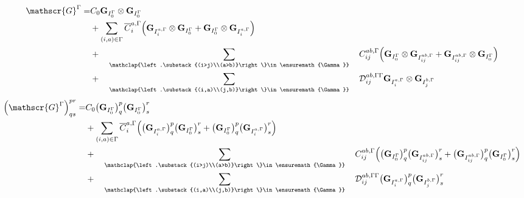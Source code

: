 \documentclass[a4paper,11pt]{article}
\newcommand{\Dmix}{\ensuremath{\mathcal{D}}}
\newcommand{\matG}{\ensuremath{{\mathbf{G}}}}
\newcommand{\bigG}{\ensuremath{{\mathscr{G}}}}
\newcommand{\irp}{\ensuremath{\Gamma}}
\newcommand{\sumijabrestr}{\ensuremath{
    \quad\sum_{\mathclap{\left.\substack{(i>j)\\(a>b)}\right\}\in\irp}}\quad}}
\newcommand{\sumijabfull}{\ensuremath{
    \quad\sum_{\mathclap{\left.\substack{(i,a)\\(j,b)}\right\}\in\irp}}\quad}}
\begin{document}
\begin{equation}
  \begin{split}
    \bigG^\irp = &
    C_0 \matG_{I_0^\irp} \otimes \matG_{I_0^\irp}\\
    & + \sum_{(i,a) \in \irp} \overline{C}_i^{a,\irp}
    \Big(
        \matG_{I_i^{a,\irp}} \otimes \matG_{I_0^\irp}
        + \matG_{I_0^\irp} \otimes \matG_{I_i^{a,\irp}}
    \Big)\\
    & + \sumijabrestr C_{ij}^{ab, \irp}
    \Big(
        \matG_{I_0^\irp} \otimes \matG_{I_{ij}^{ab,\irp}}
        + \matG_{I_{ij}^{ab,\irp}} \otimes \matG_{I_0^\irp}
    \Big)\\
    & + \sumijabfull \Dmix_{ij}^{ab, \irp\irp}
    \matG_{I_i^{a,\irp}} \otimes \matG_{I_j^{b,\irp}}\\
  \end{split}
\end{equation}
\begin{equation}
  \begin{split}
    \Big(\bigG^\irp\Big)^{pr}_{qs} = &
    C_0 \big( \matG_{I_0^\irp} \big)^p_q \big( \matG_{I_0^\irp} \big)^r_s\\
    & + \sum_{(i,a) \in \irp} \overline{C}_i^{a,\irp}
    \Big(
        \big( \matG_{I_i^{a,\irp}} \big)^p_q \big( \matG_{I_0^\irp} \big)^r_s
        + \big( \matG_{I_0^\irp} \big)^p_q \big( \matG_{I_i^{a,\irp}} \big)^r_s
    \Big)\\
    & + \sumijabrestr C_{ij}^{ab, \irp}
    \Big(
        \big( \matG_{I_0^\irp} \big)^p_q \big( \matG_{I_{ij}^{ab,\irp}} \big)^r_s
        + \big( \matG_{I_{ij}^{ab,\irp}} \big)^p_q \big( \matG_{I_0^\irp} \big)^r_s
    \Big)\\
    & + \sumijabfull \Dmix_{ij}^{ab, \irp\irp}
    \big( \matG_{I_i^{a,\irp}} \big)^p_q \big( \matG_{I_j^{b,\irp}} \big)^r_s
  \end{split}
\end{equation}
\end{document}
